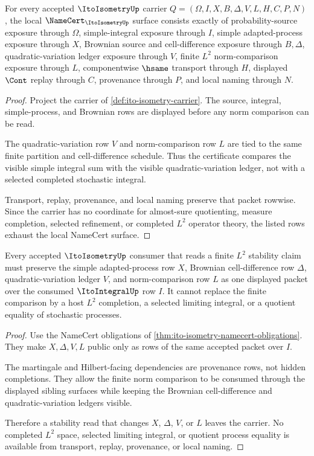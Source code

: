 \begin{theorem}
\label{thm:ito-isometry-namecert-obligations}
For every accepted $\ItoIsometryUp$ carrier $Q=(\Omega,I,X,B,\Delta,V,L,H,C,P,N)$, the local $\NameCert_{\ItoIsometryUp}$ surface consists exactly of probability-source exposure through $\Omega$, simple-integral exposure through $I$, simple adapted-process exposure through $X$, Brownian source and cell-difference exposure through $B,\Delta$, quadratic-variation ledger exposure through $V$, finite $L^2$ norm-comparison exposure through $L$, componentwise $\hsame$ transport through $H$, displayed $\Cont$ replay through $C$, provenance through $P$, and local naming through $N$.
\end{theorem}
\begin{proof}
Project the carrier of \autoref{def:ito-isometry-carrier}. The source, integral, simple-process, and Brownian rows are displayed before any norm comparison can be read.

The quadratic-variation row $V$ and norm-comparison row $L$ are tied to the same finite partition and cell-difference schedule. Thus the certificate compares the visible simple integral sum with the visible quadratic-variation ledger, not with a selected completed stochastic integral.

Transport, replay, provenance, and local naming preserve that packet rowwise. Since the carrier has no coordinate for almost-sure quotienting, measure completion, selected refinement, or completed $L^2$ operator theory, the listed rows exhaust the local NameCert surface.
\end{proof}

\begin{theorem}
\label{thm:ito-isometry-l2-stability}
Every accepted $\ItoIsometryUp$ consumer that reads a finite $L^2$ stability claim must preserve the simple adapted-process row $X$, Brownian cell-difference row $\Delta$, quadratic-variation ledger $V$, and norm-comparison row $L$ as one displayed packet over the consumed $\ItoIntegralUp$ row $I$. It cannot replace the finite comparison by a host $L^2$ completion, a selected limiting integral, or a quotient equality of stochastic processes.
\end{theorem}
\begin{proof}
Use the NameCert obligations of \autoref{thm:ito-isometry-namecert-obligations}. They make $X,\Delta,V,L$ public only as rows of the same accepted packet over $I$.

The martingale and Hilbert-facing dependencies are provenance rows, not hidden completions. They allow the finite norm comparison to be consumed through the displayed sibling surfaces while keeping the Brownian cell-difference and quadratic-variation ledgers visible.

Therefore a stability read that changes $X$, $\Delta$, $V$, or $L$ leaves the carrier. No completed $L^2$ space, selected limiting integral, or quotient process equality is available from transport, replay, provenance, or local naming.
\end{proof}


